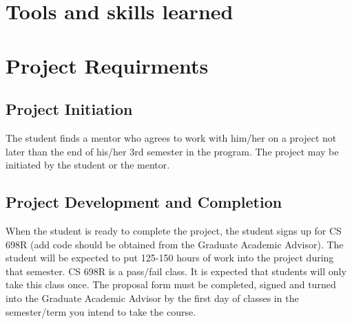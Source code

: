 \documentclass[ms,electronic,oneside,twosidetoc,letterpaper,chaptercenter,parttop]{byumsphd}
\begin{document}
\chapter{Tools and skills learned}

\chapter*{Project Requirments}

\section{Project Initiation}
The student finds a mentor who agrees to work with him/her on a project not later than the end of his/her 3rd semester in the program. The project may be initiated by the student or the mentor. 
 

\section{Project Development and Completion}

When the student is ready to complete the project, the student signs up for CS 698R (add code should be obtained from the Graduate Academic Advisor). The student will be expected to put 125-150 hours of work into the project during that semester. CS 698R is a pass/fail class. It is expected that students will only take this class once. The proposal form must be completed, signed and turned into the Graduate Academic Advisor by the first day of classes in the semester/term you intend to take the course.
\end{document}
